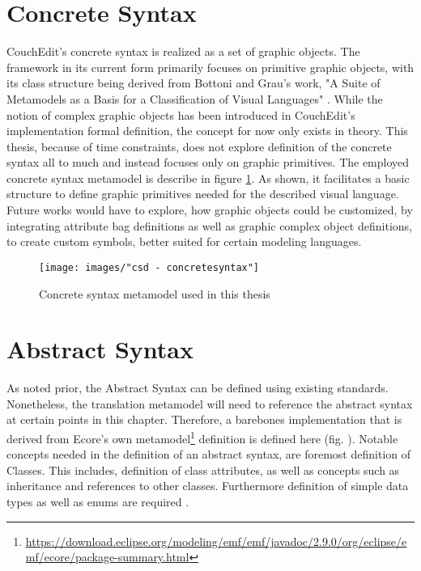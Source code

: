 \section{Concrete Syntax}
CouchEdit's concrete syntax is realized as a set of graphic objects. The framework in its current form primarily focuses on primitive graphic objects, with its class structure being derived \cite[p.39]{nachreiner_couchedit_2020} from Bottoni and Grau's work, "A Suite of Metamodels as a Basis for a Classification of Visual Languages"  \cite{bottoni_suite_2004}. While the notion of complex graphic objects has been introduced in CouchEdit's implementation formal definition, the concept for now only exists in theory. This thesis, because of time constraints, does not explore definition of the concrete syntax all to much and instead focuses only on graphic primitives. The employed concrete syntax metamodel is describe in figure \ref{fig:concretesyntax}. As shown, it facilitates a basic structure to define graphic primitives needed for the described visual language. Future works would have to explore, how graphic objects could be customized, by integrating attribute bag definitions as well as graphic complex object definitions, to create custom symbols, better suited for certain modeling languages.

\begin{figure}
\centering
\texttt{[image: images/"csd - concretesyntax"]}
\caption{Concrete syntax metamodel used in this thesis}
\label{fig:concretesyntax}
\end{figure}


\section{Abstract Syntax}
As noted prior, the Abstract Syntax can be defined using existing standards. Nonetheless, the translation metamodel will need to reference the abstract syntax at certain points in this chapter. Therefore, a barebones implementation that is derived from Ecore's own metamodel\footnote{\url{https://download.eclipse.org/modeling/emf/emf/javadoc/2.9.0/org/eclipse/emf/ecore/package-summary.html}} definition is defined here (fig. ). Notable concepts needed in the definition of an abstract syntax, are foremost definition of Classes. This includes, definition of class attributes, as well as concepts such as inheritance and references to other classes. Furthermore definition of simple data types as well as enums are required .  

